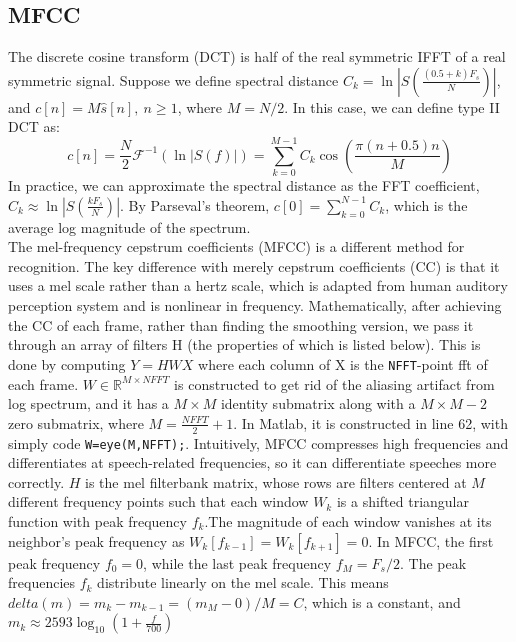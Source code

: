 \documentclass{article}
\begin{document}
	\subsection{MFCC}
	The discrete cosine transform (DCT) is half of the real symmetric IFFT of a real symmetric signal. Suppose we define spectral distance $C_k=\ln|S(\frac{(0.5+k)F_s}{N})|$, and $c[n]=M\hat{s}[n],~n\geq1$, where $M=N/2$. In this case, we can define type II DCT as:
	\begin{equation}
	c[n]=\frac{N}{2}\mathcal{F}^{-1}(\ln|S(f)|)=\sum_{k=0}^{M-1}C_k\cos(\frac{\pi(n+0.5)n}{M})
	\end{equation}
	In practice, we can approximate the spectral distance as the FFT coefficient, $C_k\approx\ln|S(\frac{kF_s}{N})|$. By Parseval's theorem, $c[0]=\sum_{k=0}^{N-1}C_k$, which is the average log magnitude of the spectrum. \\
	The mel-frequency cepstrum coefficients (MFCC) is a different method for recognition. The key difference with merely cepstrum coefficients (CC) is that it uses a mel scale rather than a hertz scale, which is adapted from human auditory perception system and is nonlinear in frequency. Mathematically, after achieving the CC of each frame, rather than finding the smoothing version, we pass it through an array of filters H (the properties of which is listed below). This is done by computing $Y = HWX$ where each column of X is the \texttt{NFFT}-point fft of each frame. $W\in\mathbb{R}^{M\times NFFT}$ is constructed to get rid of the aliasing artifact from log spectrum, and it has a $M\times M$ identity submatrix along with a $M\times M-2$ zero submatrix, where $M=\frac{NFFT}{2}+1$. In Matlab, it is constructed in line 62, with simply code \texttt{W=eye(M,NFFT);}. Intuitively, MFCC compresses high frequencies and differentiates at speech-related frequencies, so it can differentiate speeches more correctly. $H$ is the mel filterbank matrix, whose rows are filters centered at $M$ different frequency points such that each window $W_k$ is a shifted triangular function with peak frequency $f_k$.The magnitude of each window vanishes at its neighbor’s peak frequency as $W_k[f_{k-1}] = W_k[f_{k+1}] = 0$. In MFCC, the first peak frequency $f_0 = 0$, while the last peak frequency $f_M = F_s/2$. The peak frequencies $f_k$ distribute linearly on the mel scale. This means $delta(m) = m_k - m_{k-1} = (m_M - 0) / M = C$, which is a constant, and $m_k \approx  2593\log_{10}(1+\frac{f}{700})$
	
	
	
	
	
\end{document}
